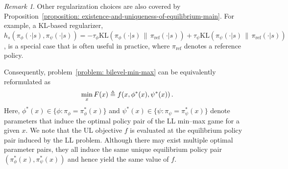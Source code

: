 \documentclass{article}
\theoremstyle{plain}
\theoremstyle{definition}
\theoremstyle{remark}
\newtheorem{remark}{Remark}
\def\R{\mathbb R}
\def\bydef{\triangleq}
\begin{document}
\begin{remark}
    Other regularization choices are also covered by Proposition~\ref{proposition: existence-and-uniqueness-of-equilibrium-main}. For example, a KL-based regularizer, $h_s(\pi_\phi(\cdot|s),\pi_\psi(\cdot|s)) = - \tau_\phi \mathrm{KL}(\pi_\phi(\cdot|s)\,\|\,\pi_{\mathrm{ref}}(\cdot|s)) + \tau_\psi \mathrm{KL}(\pi_\psi(\cdot|s)\,\|\,\pi_{\mathrm{ref}}(\cdot|s))$, is a special case that is often useful in practice, where $\pi_{\mathrm{ref}}$ denotes a reference policy.
\end{remark} 


Consequently, problem~\eqref{problem: bilevel-min-max} can be equivalently reformulated as
\vspace{-2mm}
\begin{equation}\label{eq.Fx}
    \min_{x} F(x) \bydef f\!\left(x,\phi^*(x),\psi^*(x)\right).
    \vspace{-2mm}
\end{equation}
Here, $\phi^*(x) \in \{\phi:\pi_\phi=\pi_\phi^*(x)\}$ and
$\psi^*(x) \in \{\psi:\pi_\psi=\pi_\psi^*(x)\}$ denote parameters that induce
the optimal policy pair of the LL min--max game for a given $x$.
We note that the UL objective $f$ is evaluated at the equilibrium policy pair induced by the LL problem.
Although there may exist multiple optimal parameter pairs, they all induce the same unique equilibrium policy pair $(\pi_\phi^*(x),\pi_\psi^*(x))$ and hence yield the same value of $f$.
\end{document}
